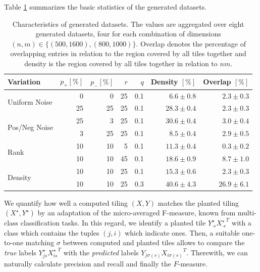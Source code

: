 Table \ref{tbl:statSynthData} summarizes the basic statistics of the generated datasets.   
\begin{table}%
	\centering
	\begin{tabular}{lrrrrrr}\toprule
Variation & $p_+[\%]$ & $p_-[\%]$ & $r$ & $q$ & Density $[\%]$ & Overlap $[\%]$ \\ \midrule
\multirow{2}{*}{Uniform Noise} &
0 & 0 & 25 & 0.1 & $6.6\pm0.8$ & $2.3\pm0.3$\\
& 25 & 25 & 25 & 0.1 & $28.3\pm0.4$ & $2.3\pm0.3$\\ \midrule
\multirow{2}{*}{Pos/Neg Noise} &25 & 3 & 25 & 0.1 & $30.6\pm0.4$ & $3.0\pm0.4$\\
 & 3 & 25 & 25 & 0.1 & $8.5\pm0.4$ & $2.9\pm0.5$\\ \midrule
\multirow{2}{*}{Rank} & 10 & 10 & 5 & 0.1 &  $11.3\pm0.4$ & $0.3\pm0.2$\\
 & 10 & 10 & 45 & 0.1 & $18.6\pm0.9$ & $8.7\pm1.0$\\ \midrule
\multirow{2}{*}{Density} & 10 & 10 & 25 & 0.1 & $15.3\pm0.6$ & $2.3\pm0.3$\\
 & 10 & 10 & 25 & 0.3 & $40.6\pm4.3$ & $26.9\pm6.1$\\\bottomrule
\end{tabular}
\caption{Characteristics of generated datasets. The values are aggregated over eight generated datasets, four for each combination of dimensions $(n,m)\in\{(500,1600),(800,1000)\}$. Overlap denotes the percentage of overlapping entries in relation to the region covered by all tiles together and density is the region covered by all tiles together in relation to $nm$.}\label{tbl:statSynthData}
\end{table}

We quantify how well a computed tiling $(X,Y)$  matches the planted tiling $(X^\star,Y^\star)$ by an adaptation of the micro-averaged F-measure, known from multi-class classification tasks. In this regard, we identify a planted tile $Y^\star_{\cdot s }{X^\star_{\cdot s}}^T$  with a class which contains the tuples $(j,i)$ which indicate ones. Then, a suitable  one-to-one matching $\sigma$ between computed and planted tiles allows to compare the \textit{true} labels $Y^\star_{j s }{X^\star_{i s}}^T$  with the \textit{predicted} labels $Y_{j \sigma(s) }{X_{i \sigma(s)}}^T$.
Therewith, we can naturally calculate precision and recall and finally the $F$-measure. 

